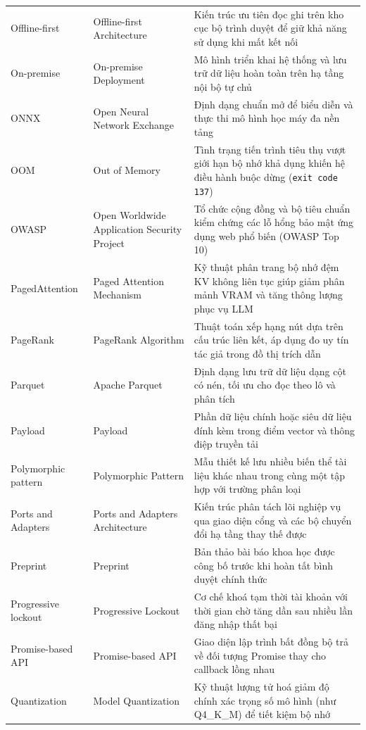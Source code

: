 {\begin{longtable}{@{}>{\raggedright\arraybackslash}p{3.4cm}>{\raggedright\arraybackslash}p{4.7cm}>{\raggedright\arraybackslash}p{7.15cm}@{}}
    Offline-first & Offline-first Architecture & Kiến trúc ưu tiên đọc ghi trên kho cục bộ trình duyệt để giữ khả năng sử dụng khi mất kết nối \\
    On-premise & On-premise Deployment & Mô hình triển khai hệ thống và lưu trữ dữ liệu hoàn toàn trên hạ tầng nội bộ tự chủ \\
    ONNX & Open Neural Network Exchange & Định dạng chuẩn mở để biểu diễn và thực thi mô hình học máy đa nền tảng \\
    OOM & Out of Memory & Tình trạng tiến trình tiêu thụ vượt giới hạn bộ nhớ khả dụng khiến hệ điều hành buộc dừng (\texttt{exit code 137}) \\
    OWASP & Open Worldwide Application Security Project & Tổ chức cộng đồng và bộ tiêu chuẩn kiểm chứng các lỗ hổng bảo mật ứng dụng web phổ biến (OWASP Top 10) \\
    PagedAttention & Paged Attention Mechanism & Kỹ thuật phân trang bộ nhớ đệm KV không liên tục giúp giảm phân mảnh VRAM và tăng thông lượng phục vụ LLM \\
    PageRank & PageRank Algorithm & Thuật toán xếp hạng nút dựa trên cấu trúc liên kết, áp dụng đo uy tín tác giả trong đồ thị trích dẫn \\
    Parquet & Apache Parquet & Định dạng lưu trữ dữ liệu dạng cột có nén, tối ưu cho đọc theo lô và phân tích \\
    Payload & Payload & Phần dữ liệu chính hoặc siêu dữ liệu đính kèm trong điểm vector và thông điệp truyền tải \\
    Polymorphic pattern & Polymorphic Pattern & Mẫu thiết kế lưu nhiều biến thể tài liệu khác nhau trong cùng một tập hợp với trường phân loại \\
    Ports and Adapters & Ports and Adapters Architecture & Kiến trúc phân tách lõi nghiệp vụ qua giao diện cổng và các bộ chuyển đổi hạ tầng thay thế được \\
    Preprint & Preprint & Bản thảo bài báo khoa học được công bố trước khi hoàn tất bình duyệt chính thức \\
    Progressive lockout & Progressive Lockout & Cơ chế khoá tạm thời tài khoản với thời gian chờ tăng dần sau nhiều lần đăng nhập thất bại \\
    Promise-based API & Promise-based API & Giao diện lập trình bất đồng bộ trả về đối tượng Promise thay cho callback lồng nhau \\
    Quantization & Model Quantization & Kỹ thuật lượng tử hoá giảm độ chính xác trọng số mô hình (như Q4\_K\_M) để tiết kiệm bộ nhớ \\

\end{longtable}}
